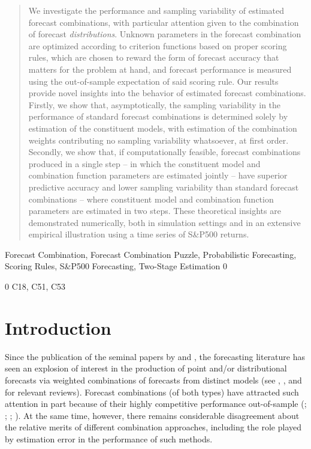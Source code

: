 \documentclass[12pt]{article}
\newcommand{\blind}{0}
\theoremstyle{definition}
\theoremstyle{remark}
\begin{document}
\begin{abstract}
We investigate the performance and sampling variability of estimated forecast combinations, with particular attention given to the combination of forecast \textit{distributions}. Unknown parameters in the forecast combination are optimized according to criterion functions based on proper scoring rules, which are chosen to reward the form of forecast accuracy that matters for the problem at hand, and forecast performance is measured using the out-of-sample expectation of said scoring rule. Our results provide novel insights into the behavior of estimated forecast combinations. Firstly, we show that, {asymptotically}, the sampling variability in the performance of standard forecast combinations is determined {solely} by estimation of the constituent models, with estimation of the combination weights contributing no sampling variability whatsoever, at first order. Secondly, we show that, if computationally feasible, forecast combinations produced in a single step -- in which the constituent model and combination function parameters are estimated jointly -- have superior {predictive }accuracy and lower sampling variability than standard forecast combinations -- where constituent model and combination function parameters are estimated in two steps. These theoretical insights are demonstrated numerically, both in simulation settings and in an extensive empirical illustration using a time series of S\&P500 returns.
\end{abstract}

  Forecast Combination, Forecast Combination Puzzle, Probabilistic Forecasting, Scoring Rules, S\&P500 Forecasting, Two-Stage Estimation \blind { \\ } \fi

\blind
{
   C18, C51, C53 \\
} \fi


\section{Introduction}

Since the publication of the seminal papers by \cite{Stone1961} and \cite{Bates1969}, the forecasting literature has seen an explosion of interest in the production of point and/or distributional forecasts via weighted combinations of forecasts from distinct models (see \citealp{Timmermann2006}, \citealp{Aastveit2019}, and \citealp{Wang2022} for relevant reviews). Forecast combinations (of both types) have attracted such attention in part because of their highly competitive performance out-of-sample (\citealp{Makridakis2018, Makridakis2020}; \citealp{Thorey2018}; \citealp{Wang2018}; \citealp{Taylor2020}). At the same time, however, there remains considerable disagreement about the relative merits of different combination approaches, including the role played by estimation error in the performance of such methods.
\end{document}
